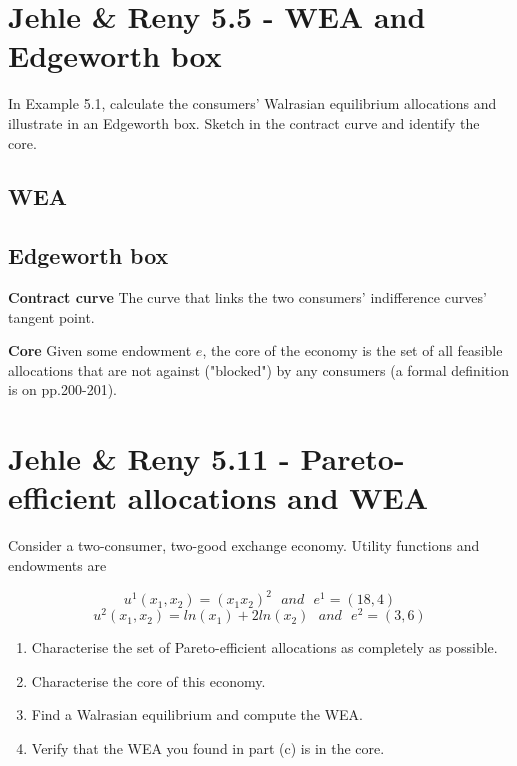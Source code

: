\documentclass{article}
\begin{document}
\section{Jehle \& Reny 5.5 - WEA and Edgeworth box}

In Example 5.1, calculate the consumers' Walrasian equilibrium allocations and illustrate in an
Edgeworth box. Sketch in the contract curve and identify the core.


\subsection{WEA}




\subsection{Edgeworth box}

\begin{mdframed}[backgroundcolor=blue!20,linecolor=white]
\textbf{Contract curve} The curve that links the two consumers' indifference curves' tangent point.

\textbf{Core} Given some endowment $e$, the core of the economy is the set of all feasible allocations that are not against ("blocked") by any consumers (a formal definition is on pp.200-201).

\end{mdframed}





\section{Jehle \& Reny 5.11 - Pareto-efficient allocations and WEA}

Consider a two-consumer, two-good exchange economy. Utility functions and endowments are

$$u^1(x_1,x_2) = (x_1x_2)^2 \ \ \ and \ \ \  e^1 = (18,4)$$
$$u^2(x_1,x_2) = ln(x_1) + 2 ln(x_2) \ \ \ and \ \ \  e^2 = (3,6)$$

\begin{enumerate}
\item Characterise the set of Pareto-efficient allocations as completely as possible.
\item Characterise the core of this economy.
\item Find a Walrasian equilibrium and compute the WEA.
\item Verify that the WEA you found in part (c) is in the core.
\end{enumerate}
\end{document}
